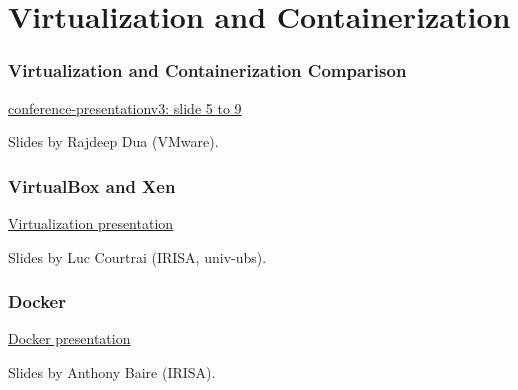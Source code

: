 \section{Virtualization and Containerization}

  \begin{frame}
      \frametitle{Virtualization and Containerization Comparison}
      \color{blue}\href{http://www.slideshare.net/rajdeep/conference-presentationv3}{conference-presentationv3: slide 5 to 9} \color{black}

      Slides by Rajdeep Dua (VMware).
  \end{frame}

    \begin{frame}
        \frametitle{VirtualBox and Xen}
        \color{blue}\href{http://foad.univ-ubs.fr/pluginfile.php/141994/mod_resource/content/2/virtualisation.pdf}{Virtualization presentation} \color{black}

        Slides by Luc Courtrai (IRISA, univ-ubs).
    \end{frame}

    \begin{frame}
        \frametitle{Docker}
        \color{blue}\href{http://people.irisa.fr/Anthony.Baire/docker-tutorial.pdf}{Docker presentation} \color{black}

        Slides by Anthony Baire (IRISA).
    \end{frame}
